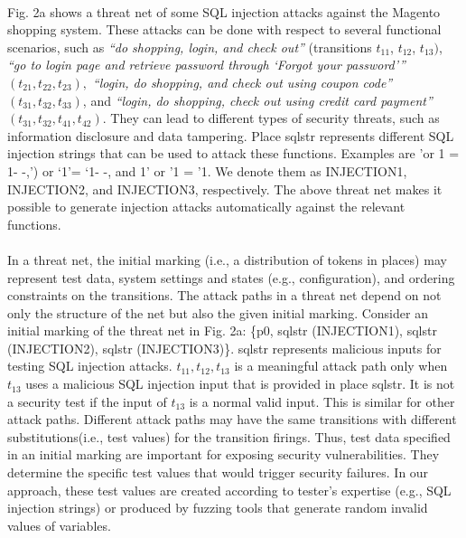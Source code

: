 \paragraph{}Fig. 2a shows a threat net of some SQL injection attacks against the Magento shopping system. These attacks can be done with respect to several functional scenarios, such as \textit{“do shopping, login, and check out”} (transitions $t_{11}$, $t_{12}$, $t_{13})$, \textit{“go to login page and retrieve password through \lq Forgot your password\rq”} $(t_{21}, t_{22}, t_{23}),$ \textit{“login, do shopping, and check out using coupon code”} $(t_{31}, t_{32}, t_{33})$, and \textit{“login, do shopping, check out using credit card payment”} $(t_{31}, t_{32}, t_{41}, t_{42})$. They can lead to different types of security threats, such as information disclosure and data tampering. Place sqlstr
represents different SQL injection strings that can be used
to attack these functions. Examples are 'or 1 = 1- -,') or \lq1\rq = ‘1- -, and 1’ or '1 = '1. We denote them as INJECTION1, INJECTION2, and INJECTION3, respectively. The above threat net makes it possible to generate injection attacks
automatically against the relevant functions.
\paragraph{}In a threat net, the initial marking (i.e., a distribution of tokens in places) may represent test data, system settings and states (e.g., configuration), and ordering constraints on the transitions. The attack paths in a threat net depend on not only the structure of the net but also the given initial
marking. Consider an initial marking of the threat net in Fig. 2a: \{p0, sqlstr (INJECTION1), sqlstr (INJECTION2), sqlstr (INJECTION3)\}. sqlstr represents malicious inputs for testing SQL injection attacks. $t_{11}, t_{12}, t_{13}$ is a meaningful attack path only when $t_{13}$ uses a malicious SQL injection input that is provided in place sqlstr. It is not a security test if the input of
$t_{13}$ is a normal valid input. This is similar for other attack paths. Different attack paths may have the same transitions with different substitutions(i.e., test values) for the transition firings. Thus, test data specified in an initial marking are important for exposing security vulnerabilities. They determine the specific test values that would trigger security failures. In our approach, these test values are created according to tester\rq s expertise (e.g., SQL injection strings) or
produced by fuzzing tools that generate random invalid
values of variables.
